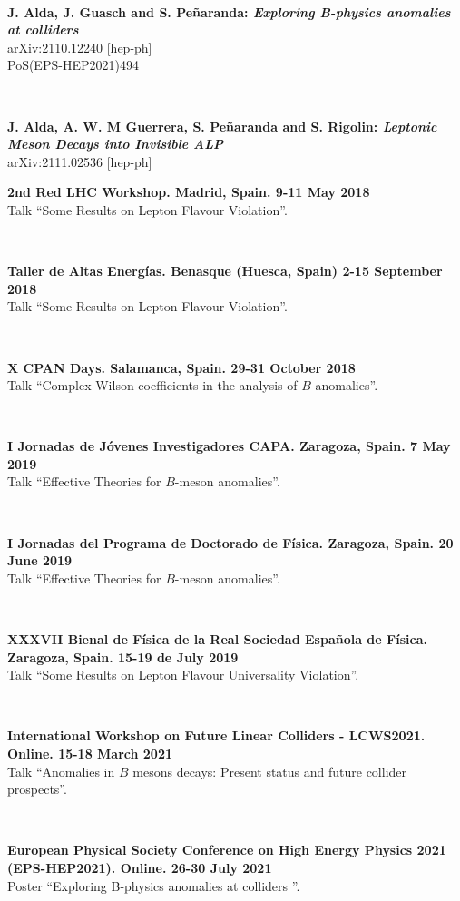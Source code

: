 \documentclass[combined.tex]{subfiles}
\begin{document}
~

\textbf{J. Alda, J. Guasch and S. Peñaranda: \textit{Exploring B-physics anomalies at colliders}}\\
arXiv:2110.12240 [hep-ph]\\
PoS(EPS-HEP2021)494

~

\textbf{J. Alda, A. W. M Guerrera, S. Peñaranda and S. Rigolin: \textit{Leptonic Meson Decays into Invisible ALP}}\\
arXiv:2111.02536 [hep-ph]


\hspace{\parindent}\textbf{2nd Red LHC Workshop. Madrid, Spain. 9-11 May 2018}\\
Talk ``Some Results on Lepton Flavour Violation''.

~

\textbf{Taller de Altas Energías. Benasque (Huesca, Spain) 2-15 September 2018}\\
Talk ``Some Results on Lepton Flavour Violation''.

~

\textbf{X CPAN Days. Salamanca, Spain. 29-31 October 2018}\\
Talk ``Complex Wilson coefficients in the analysis of $B$-anomalies''.

~

\textbf{I Jornadas de Jóvenes Investigadores CAPA. Zaragoza, Spain. 7 May 2019}\\
Talk ``Effective Theories for $B$-meson anomalies''.

~

\textbf{I Jornadas del Programa de Doctorado de Física. Zaragoza, Spain. 20 June 2019}\\
Talk ``Effective Theories for $B$-meson anomalies''.

~

\textbf{XXXVII Bienal de Física de la Real Sociedad Española de Física. Zaragoza, Spain. 15-19 de July 2019}\\
Talk ``Some Results on Lepton Flavour Universality Violation''.

~

\textbf{International Workshop on Future Linear Colliders - LCWS2021. Online. 15-18 March 2021}\\
Talk ``Anomalies in $B$ mesons decays: Present status and future collider prospects''.

~

\textbf{European Physical Society Conference on High Energy Physics 2021 (EPS-HEP2021). Online. 26-30 July 2021}\\
Poster ``Exploring B-physics anomalies at colliders ''.
\end{document}
